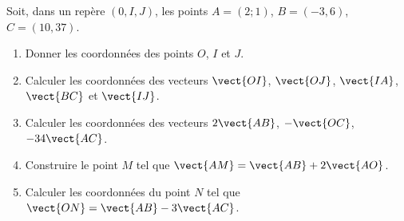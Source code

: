 
\begin{exercice}\label{exosmath-0107}

    Soit, dans un repère \( (0,I,J)\), les points \( A=(2;1)\), \( B=(-3,6)\), \( C=(10,37)\).
    \begin{enumerate}
        \item
            Donner les coordonnées des points \( O\), \( I\) et \( J\).
        \item
            Calculer les coordonnées des vecteurs \( \vect{ OI }\), \( \vect{ OJ }\), \( \vect{ IA }\), \( \vect{ BC }\) et \( \vect{ IJ }\).
        \item
            Calculer les coordonnées des vecteurs \( 2\vect{ AB  }\), \( -\vect{ OC }\), \( -34\vect{ AC }\).
        \item
            Construire le point \( M\) tel que \( \vect{ AM }=\vect{ AB }+2\vect{ AO }\).
        \item
            Calculer les coordonnées du point \( N\) tel que \( \vect{ ON }=\vect{ AB }-3\vect{ AC }\).
    \end{enumerate}

\end{exercice}
